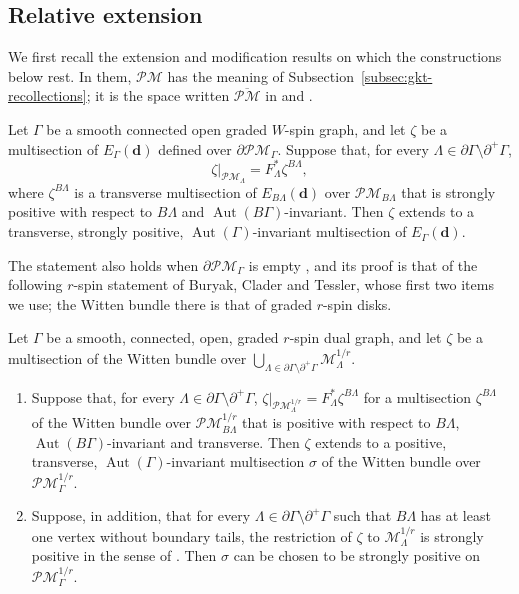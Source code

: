 \subsection{Relative extension}
\label{subsec:gkt-relative-extension}

We first recall the extension and modification results on which the
constructions below rest.  In them, $\mathcal{PM}$ has the meaning of
Subsection~\ref{subsec:gkt-recollections}; it is the space written
$\overline{\mathcal{PM}}$ in \cite{grossetal2022open} and
\cite{buryaketal2024}.

\begin{importedthm}
Let $\Gamma$ be a smooth connected open graded $W$-spin graph, and let
$\zeta$ be a multisection of $E_\Gamma(\mathbf d)$ defined over
$\partial\mathcal{PM}_\Gamma$.  Suppose that, for every
$\Lambda\in\partial\Gamma\setminus\partial^+\Gamma$,
\[
 \zeta|_{\mathcal{PM}_\Lambda}=F_\Lambda^*\zeta^{B\Lambda},
\]
where $\zeta^{B\Lambda}$ is a transverse multisection of
$E_{B\Lambda}(\mathbf d)$ over $\mathcal{PM}_{B\Lambda}$ that is strongly
positive with respect to $B\Lambda$ and $\operatorname{Aut}(B\Gamma)$-invariant.
Then $\zeta$ extends to a transverse, strongly positive,
$\operatorname{Aut}(\Gamma)$-invariant multisection of $E_\Gamma(\mathbf d)$.
\end{importedthm}

The statement also holds when $\partial\mathcal{PM}_\Gamma$ is empty
\cite[Rem.~5.16]{grossetal2022open}, and its proof is that of the following
$r$-spin statement of Buryak, Clader and Tessler, whose first two items we
use; the Witten bundle there is that of graded $r$-spin disks.

\begin{importedthm}
Let $\Gamma$ be a smooth, connected, open, graded $r$-spin dual graph, and let
$\zeta$ be a multisection of the Witten bundle over
$\bigcup_{\Lambda\in\partial\Gamma\setminus\partial^+\Gamma}
\mathcal M^{1/r}_\Lambda$.
\begin{enumerate}
\item Suppose that, for every
$\Lambda\in\partial\Gamma\setminus\partial^+\Gamma$,
$\zeta|_{\mathcal{PM}^{1/r}_\Lambda}=F_\Lambda^*\zeta^{B\Lambda}$ for a
multisection $\zeta^{B\Lambda}$ of the Witten bundle over
$\mathcal{PM}^{1/r}_{B\Lambda}$ that is positive with respect to $B\Lambda$,
$\operatorname{Aut}(B\Gamma)$-invariant and transverse.  Then $\zeta$ extends
to a positive, transverse, $\operatorname{Aut}(\Gamma)$-invariant multisection
$\sigma$ of the Witten bundle over $\mathcal{PM}^{1/r}_\Gamma$.
\item Suppose, in addition, that for every
$\Lambda\in\partial\Gamma\setminus\partial^+\Gamma$ such that $B\Lambda$ has
at least one vertex without boundary tails, the restriction of $\zeta$ to
$\mathcal M^{1/r}_\Lambda$ is strongly positive in the sense of
\cite[Def.~6.1]{buryaketal2024}.  Then $\sigma$ can be chosen to be strongly
positive on $\mathcal{PM}^{1/r}_\Gamma$.
\end{enumerate}
\end{importedthm}

